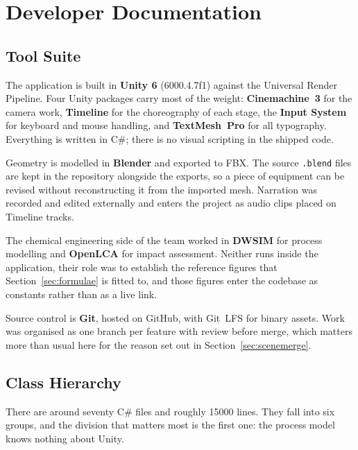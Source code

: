 \section{Developer Documentation}

\subsection{Tool Suite}

The application is built in \textbf{Unity 6} (6000.4.7f1) against the Universal Render Pipeline. Four Unity packages carry most of the weight: \textbf{Cinemachine~3} for the camera work, \textbf{Timeline} for the choreography of each stage, the \textbf{Input System} for keyboard and mouse handling, and \textbf{TextMesh~Pro} for all typography. Everything is written in C\#; there is no visual scripting in the shipped code.

Geometry is modelled in \textbf{Blender} and exported to FBX. The source
\texttt{.blend} files are kept in the repository alongside the exports, so a piece of equipment can be revised without reconstructing it from the imported mesh. Narration was recorded and edited externally and enters the project as audio clips placed on Timeline tracks.

The chemical engineering side of the team worked in \textbf{DWSIM} for process modelling and \textbf{OpenLCA} for impact assessment. Neither runs inside the application, their role was to establish the reference figures that Section~\ref{sec:formulae} is fitted to, and those figures enter the codebase as constants rather than as a live link.

Source control is \textbf{Git}, hosted on GitHub, with Git~LFS for binary
assets. Work was organised as one branch per feature with review before merge, which matters more than usual here for the reason set out in
Section~\ref{sec:scenemerge}.

\subsection{Class Hierarchy}

There are around seventy C\# files and roughly \num{15000} lines. They fall into six groups, and the division that matters most is the first one: the process model knows nothing about Unity.

